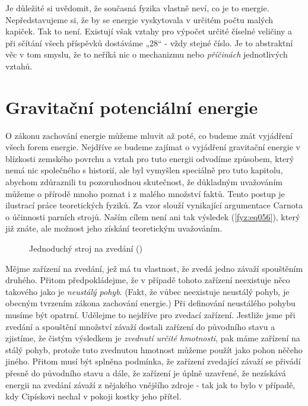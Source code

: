     Je důležité si uvědomit, že současná fyzika vlastně neví, co je to energie. Nepředstavujeme si, 
    že by se energie vyskytovala v určitém počtu malých kapiček. Tak to není. Existují však vztahy 
    pro výpočet určité číselné veličiny a při sčítání všech příspěvků dostáváme „\num{28}“ - vždy 
    stejné číslo. Je to abstraktní věc v tom smyslu, že to neříká nic o mechanizmu nebo 
    \emph{příčinách} jednotlivých vztahů.
    
  \section{Gravitační potenciální energie}
    O zákonu zachování energie můžeme mluvit až poté, co budeme znát vyjádření všech forem energie. 
    Nejdříve se budeme zajímat o vyjádření gravitační energie v blízkosti zemského povrchu a vztah 
    pro tuto energii odvodíme způsobem, který nemá nic společného s historií, ale byl vymyšlen 
    speciálně pro tuto kapitolu, abychom zdůraznili tu pozoruhodnou skutečnost, že důkladným 
    uvažováním můžeme o přírodě mnoho poznat i z malého množství faktů. Tento postup je ilustrací 
    práce teoretických fyziků. Za vzor slouží vynikající argumentace Carnota o účinnosti parních 
    strojů. Naším cílem není ani tak výsledek (\ref{fyz:eq056}), který již znáte, ale možnost jeho 
    získání teoretickým uvažováním.

    \begin{figure}[ht!]  %
      \centering
      \caption{Jednoduchý stroj na zvedání (\cite[s.~52]{Feynman01})}
      \label{fyz:fig0048}
    \end{figure}
    Mějme zařízení na zvedání, jež má tu vlastnost, že zvedá jedno závaží spouštěním druhého. 
    Přitom předpokládejme, že v případě tohoto zařízení neexistuje něco takového jako je 
    \emph{neustálý pohyb}. (Fakt, že vůbec neexistuje neustálý pohyb, je obecným tvrzením zákona 
    zachování energie.) Při definování neustálého pohybu musíme být opatrní. Udělejme to nejdříve 
    pro zvedací zařízení. Jestliže jsme při zvedání a spouštění množství závaží dostali zařízení do 
    původního stavu a zjistíme, že čistým výsledkem je \emph{zvednutí určité hmotnosti}, pak máme 
    zařízení na stálý pohyb, protože tuto zvednutou hmotnost můžeme použít jako pohon něčeho 
    jiného. Přitom musí být splněna podmínka, že zařízení zvedající závaží se přivádí přesně do 
    původního stavu a dále, že zařízení je úplně uzavřené, že nezískává energii na zvedání závaží z 
    nějakého vnějšího zdroje - tak jak to bylo v případě, kdy Cipískovi nechal v pokoji kostky jeho 
    přítel.
    
